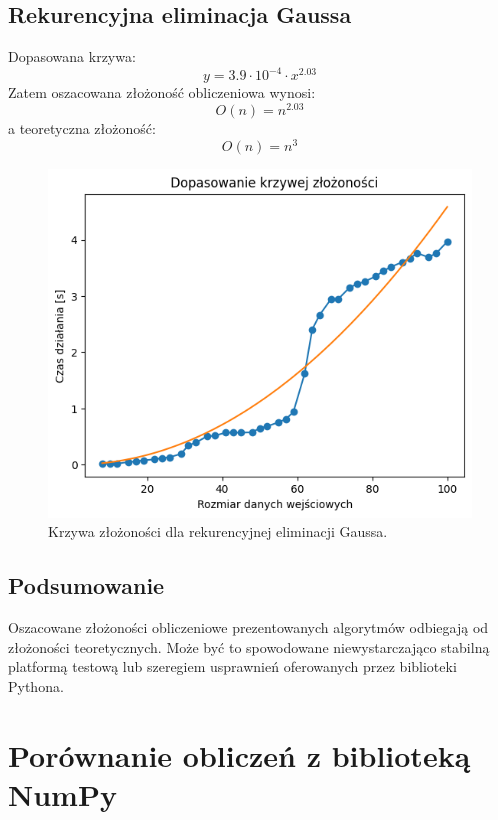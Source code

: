 \documentclass[11pt, leqno]{scrartcl}
\begin{document}
    \subsection{Rekurencyjna eliminacja Gaussa}
    Dopasowana krzywa:
    \[
        y=3.9 \cdot 10^{-4} \cdot x^{2.03}
    \]
    Zatem oszacowana złożoność obliczeniowa wynosi:
    \[
        O(n)=n^{2.03}
    \]
    a teoretyczna złożoność:
    \[
        O(n)=n^3
    \]
    \begin{figure}[H]
        \centering
        \includegraphics[width=0.7\linewidth]{zlozonosc_gauss.png}
        \caption{Krzywa złożoności dla rekurencyjnej eliminacji
            Gaussa.}
    \end{figure}

    \subsection{Podsumowanie}
    Oszacowane złożoności obliczeniowe prezentowanych algorytmów
    odbiegają od złożoności teoretycznych. Może być to spowodowane
    niewystarczająco stabilną platformą testową lub szeregiem
    usprawnień oferowanych przez biblioteki Pythona.

    \section{Porównanie obliczeń z biblioteką NumPy}
    
\end{document}

